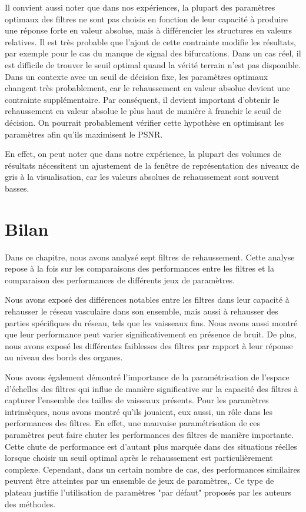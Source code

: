 Il convient aussi noter que dans nos expériences, la plupart des paramètres optimaux des filtres ne sont pas choisis en fonction de leur capacité à produire une réponse forte en valeur absolue, mais à différencier les structures en valeurs relatives. Il est très probable que l'ajout de cette contrainte modifie les résultats, par exemple pour le cas du manque de signal des bifurcations.
Dans un cas réel, il est difficile de trouver le seuil optimal quand la vérité terrain n'est pas disponible. Dans un contexte avec un seuil de décision fixe, les paramètres optimaux changent très probablement, car le rehaussement en valeur absolue devient une contrainte supplémentaire. Par conséquent, il devient important d'obtenir le rehaussement en valeur absolue le plus haut de manière à franchir le seuil de décision. On pourrait probablement vérifier cette hypothèse en optimisant les paramètres afin qu'ils maximisent le PSNR.

En effet, on peut noter que dans notre expérience, la plupart des volumes de résultats nécessitent un ajustement de la fenêtre de représentation des niveaux de gris à la visualisation, car les valeurs absolues de rehaussement sont souvent basses.

\section{Bilan}

Dans ce chapitre, nous avons analysé sept filtres de rehaussement. Cette analyse repose à la fois sur les comparaisons des performances entre les filtres et la comparaison des performances de différents jeux de paramètres. 

Nous avons exposé des différences notables entre les filtres dans leur capacité à rehausser le réseau vasculaire dans son ensemble, mais aussi à rehausser des parties spécifiques du réseau, tels que les vaisseaux fins. Nous avons aussi montré que leur performance peut varier significativement en présence de bruit. De plus, nous avons exposé les différentes faiblesses des filtres par rapport à leur réponse au niveau des bords des organes.

Nous avons également démontré l'importance de la paramétrisation de l'espace d'échelles des filtres qui influe de manière significative sur la capacité des filtres à capturer l'ensemble des tailles de vaisseaux présents. Pour les paramètres intrinsèques, nous avons montré qu'ils jouaient, eux aussi, un rôle dans les performances des filtres. En effet, une mauvaise paramétrisation de ces paramètres peut faire chuter les performances des filtres de manière importante. Cette chute de performance est d'autant plus marquée dans des situations réelles lorsque choisir un seuil optimal après le rehaussement est particulièrement complexe. Cependant, dans un certain nombre de cas, des performances similaires peuvent être atteintes par un ensemble de jeux de paramètres,. Ce type de plateau justifie l'utilisation de paramètres "par défaut" proposés par les auteurs des méthodes.   

